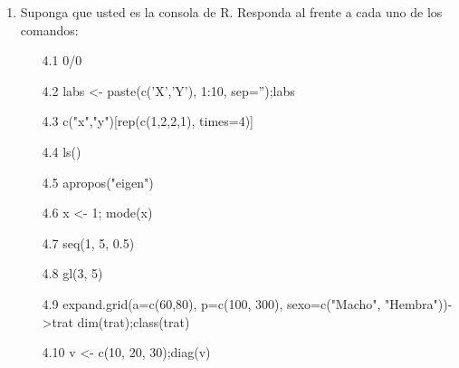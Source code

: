 \documentclass[letterpaper, 12pt]{article}
\begin{document}
\begin{enumerate}
\item Suponga que usted es la consola de R. Responda al frente a cada uno
de los comandos:
\begin{enumerate}
\item[4.1] 0/0
\item[4.2] labs <- paste(c('X','Y'), 1:10, sep='');labs
\item[4.3] c("x","y")[rep(c(1,2,2,1), times=4)]
\item[4.4] ls()
\item[4.5] apropos("eigen")
\item[4.6] x <- 1; mode(x)
\item[4.7] seq(1, 5, 0.5)
\item[4.8] gl(3, 5)
\item[4.9] expand.grid(a=c(60,80), p=c(100, 300),
sexo=c("Macho", "Hembra"))->trat
dim(trat);class(trat)
\item[4.10] v <- c(10, 20, 30);diag(v)
\end{enumerate}

\end{enumerate}
\end{document}
